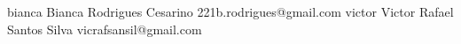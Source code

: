    {bianca}
    {Bianca Rodrigues Cesarino}
    {221b.rodrigues@gmail.com}
    {victor}
    {Victor Rafael Santos Silva}
    {vicrafsansil@gmail.com}

